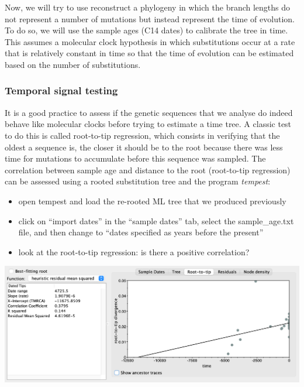 \documentclass[
  letterpaper,
]{book}
\providecommand{\tightlist}{%
  \setlength{\itemsep}{0pt}\setlength{\parskip}{0pt}}\usepackage{longtable,booktabs,array}
\begin{document}
Now, we will try to use reconstruct a phylogeny in which the branch
lengths do not represent a number of mutations but instead represent the
time of evolution. To do so, we will use the sample ages (C14 dates) to
calibrate the tree in time. This assumes a molecular clock hypothesis in
which substitutions occur at a rate that is relatively constant in time
so that the time of evolution can be estimated based on the number of
substitutions.

\hypertarget{temporal-signal-testing}{%
\subsubsection{Temporal signal testing}\label{temporal-signal-testing}}

It is a good practice to assess if the genetic sequences that we analyse
do indeed behave like molecular clocks before trying to estimate a time
tree. A classic test to do this is called root-to-tip regression, which
consists in verifying that the oldest a sequence is, the closer it
should be to the root because there was less time for mutations to
accumulate before this sequence was sampled. The correlation between
sample age and distance to the root (root-to-tip regression) can be
assessed using a rooted substitution tree and the program
\emph{tempest}:

\begin{itemize}
\tightlist
\item
  open tempest and load the re-rooted ML tree that we produced
  previously
\item
  click on ``import dates'' in the ``sample dates'' tab, select the
  sample\_age.txt file, and then change to ``dates specified as years
  before the present''
\item
  look at the root-to-tip regression: is there a positive correlation?
\end{itemize}

\includegraphics{assets/images/chapters/phylogenomics/Tempest.png}
\end{document}
